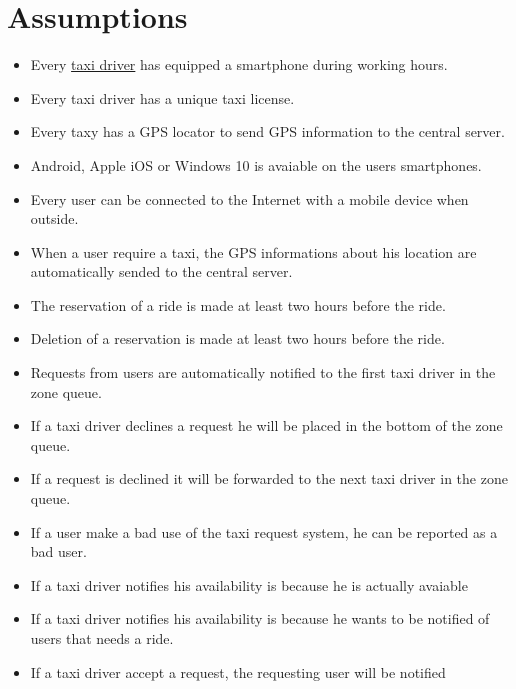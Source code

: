 \documentclass{report}
\begin{document}
	\section{Assumptions}

			\begin{itemize}
				\item Every \hyperref[sec:tdriver]{taxi driver} has equipped a smartphone during working hours.

				\item Every taxi driver has a unique taxi license.

				\item Every taxy has a GPS locator to send GPS information to the central server.

				\item Android, Apple iOS or Windows 10 is avaiable on the users smartphones.

				\item Every user can be connected to the Internet with a mobile device when outside.

				\item When a user require a taxi, the GPS informations about his location are automatically sended to the central server.

				\item The reservation of a ride is made at least two hours before the ride.

				\item Deletion of a reservation is made at least two hours before the ride.

				\item Requests from users are automatically notified to the first taxi driver in the zone queue.

				\item If a taxi driver declines a request he will be placed in the bottom of the zone queue.

				\item If a request is declined it will be forwarded to the next taxi driver in the zone queue.

				\item If a user make a bad use of the taxi request system, he can be reported as a bad user.

				\item If a taxi driver notifies his availability is because he is actually avaiable

				\item If a taxi driver notifies his availability is because he wants to be notified of users that needs a ride.

				\item If a taxi driver accept a request, the requesting user will be notified
			\end{itemize}
\end{document}
